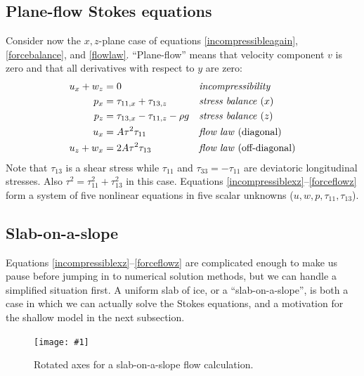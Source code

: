 \documentclass[letterpaper,final,12pt,reqno]{amsart}
\newcommand{\onefigsize}[3]{
\begin{figure}[ht]
\centering
\texttt{[image: \#1]}
\caption{#2}
\label{fig:#1}
\end{figure}}
\newcommand{\onefig}[2]{\onefigsize{#1}{#2}{3.0in}}
\begin{document}
\subsection*{Plane-flow Stokes equations}  Consider now the $x,z$-plane case of equations \eqref{incompressibleagain}, \eqref{forcebalance}, and \eqref{flowlaw}.  ``Plane-flow'' means that velocity component $v$ is zero and that all derivatives with respect to $y$ are zero:
\begin{align}
u_x + w_z &= 0 &&\text{\emph{incompressibility}} \label{incompressiblexz} \\
p_x &= \tau_{11,x} + \tau_{13,z} &&\text{\emph{stress balance} ($x$)} \label{stokespx} \\
p_z &= \tau_{13,x} - \tau_{11,z} - \rho g &&\text{\emph{stress balance} ($z$)} \label{stokespz} \\
u_x &= A \tau^2 \tau_{11} &&\text{\emph{flow law} (diagonal)}  \label{forceflowx} \\
u_z + w _x &= 2 A \tau^2 \tau_{13} &&\text{\emph{flow law} (off-diagonal)} \label{forceflowz}
\end{align}
Note that $\tau_{13}$ is a shear stress while $\tau_{11}$ and $\tau_{33}=-\tau_{11}$ are deviatoric longitudinal stresses.  Also $\tau^2 = \tau_{11}^2+\tau_{13}^2$ in this case.  Equations \eqref{incompressiblexz}--\eqref{forceflowz} form a system of five nonlinear equations in five scalar unknowns ($u,w,p,\tau_{11},\tau_{13}$).

\subsection*{Slab-on-a-slope}  Equations \eqref{incompressiblexz}--\eqref{forceflowz} are complicated enough to make us pause before jumping in to numerical solution methods, but  we can handle a simplified situation first.  A uniform slab of ice, or a ``slab-on-a-slope'', is both a case in which we can actually solve the Stokes equations, and a motivation for the shallow model in the next subsection.

\onefig{slab}{Rotated axes for a slab-on-a-slope flow calculation.}
\end{document}
